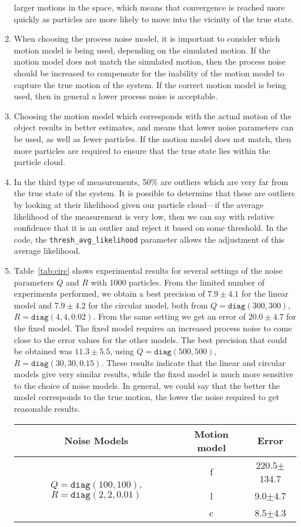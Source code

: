 \documentclass[a4paper,12pt]{article}
\begin{document}
\begin{enumerate}
  larger motions in the space, which means that convergence is reached more
  quickly as particles are more likely to move into the vicinity of the true
  state.
\item When choosing the process noise model, it is important to consider which
  motion model is being used, depending on the simulated motion. If the motion
  model does not match the simulated motion, then the process noise should be
  increased to compensate for the inability of the motion model to capture the
  true motion of the system. If the correct motion model is being used, then in
  general a lower process noise is acceptable.
\item Choosing the motion model which corresponds with the actual motion of the
  object results in better estimates, and means that lower noise parameters can
  be used, as well as fewer particles. If the motion model does not match, then
  more particles are required to ensure that the true state lies within the
  particle cloud.
\item In the third type of measurements, 50\% are outliers which are very far
  from the true state of the system. It is possible to determine that these are
  outliers by looking at their likelihood given our particle cloud---if the
  average likelihood of the measurement is very low, then we can say with
  relative confidence that it is an outlier and reject it based on some
  threshold. In the code, the \texttt{thresh\_avg\_likelihood} parameter allows
  the adjustment of this average likelihood.
\item Table~\ref{tab:circ} shows experimental results for several settings of
  the noise parameters $Q$ and $R$ with 1000 particles. From the limited number
  of experiments performed, we obtain a best precision of $7.9\pm 4.1$ for the
  linear model and $7.9\pm 4.2$ for the circular model, both from
  $Q=\texttt{diag}(300,300)$, $R=\texttt{diag}(4, 4, 0.02)$. From the same
  setting we get an error of $20.0\pm 4.7$ for the fixed model. The fixed model
  requires an increased process noise to come close to the error values for the
  other models. The best precision that could be obtained was $11.3\pm 5.5$,
  using $Q=\texttt{diag}(500,500)$, $R=\texttt{diag}(30,30,0.15)$. These results
  indicate that the linear and circular models give very similar results, while
  the fixed model is much more sensitive to the choice of noise models. In
  general, we could say that the better the model corresponds to the true
  motion, the lower the noise required to get reasonable results.
  \begin{table}
    \centering
    \begin{tabular}{ccc}
      Noise Models                    & Motion model & Error \\\hline
      \multirow{3}{*}{$Q=\texttt{diag}(100,100)$, $R=\texttt{diag}(2, 2, 0.01)$}& f    & 220.5$\pm$134.7 \\
      & l    & 9.0$\pm$4.7     \\
      & c    & 8.5$\pm$4.3     \\\hline


\end{tabular}
\end{table}
\end{enumerate}
\end{document}
